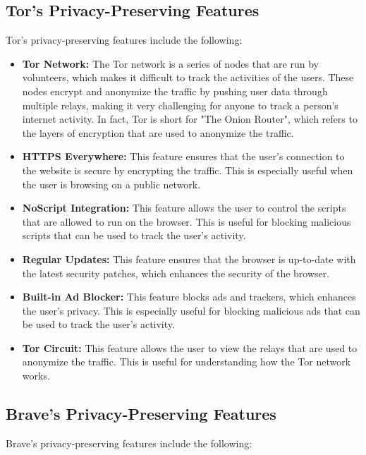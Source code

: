 \documentclass[conference]{IEEEtran}
\begin{document}
\subsection{Tor's Privacy-Preserving Features}

Tor's privacy-preserving features include the following\cite{b3}:

\begin{itemize}
    \item \textbf{Tor Network:} The Tor network is a series of nodes that are
    run by volunteers, which makes it difficult to track the activities of the
    users. These nodes encrypt and anonymize the traffic by pushing user data
    through multiple relays, making it very challenging for anyone to track a
    person's internet activity. In fact, Tor is short for "The Onion Router",
    which refers to the layers of encryption that are used to anonymize the
    traffic.
    \item \textbf{HTTPS Everywhere:} This feature ensures that the user's
    connection to the website is secure by encrypting the traffic. This is
    especially useful when the user is browsing on a public network.
    \item \textbf{NoScript Integration:} This feature allows the user to control
    the scripts that are allowed to run on the browser. This is useful for
    blocking malicious scripts that can be used to track the user's activity.
    \item \textbf{Regular Updates:} This feature ensures that the browser is
    up-to-date with the latest security patches, which enhances the security of
    the browser.
    \item \textbf{Built-in Ad Blocker:} This feature blocks ads and trackers,
    which enhances the user's privacy. This is especially useful for blocking
    malicious ads that can be used to track the user's activity.
    \item \textbf{Tor Circuit:} This feature allows the user to view the
    relays that are used to anonymize the traffic. This is useful for
    understanding how the Tor network works.
\end{itemize}

\subsection{Brave's Privacy-Preserving Features}

Brave's privacy-preserving features include the following\cite{b4}:
\end{document}
